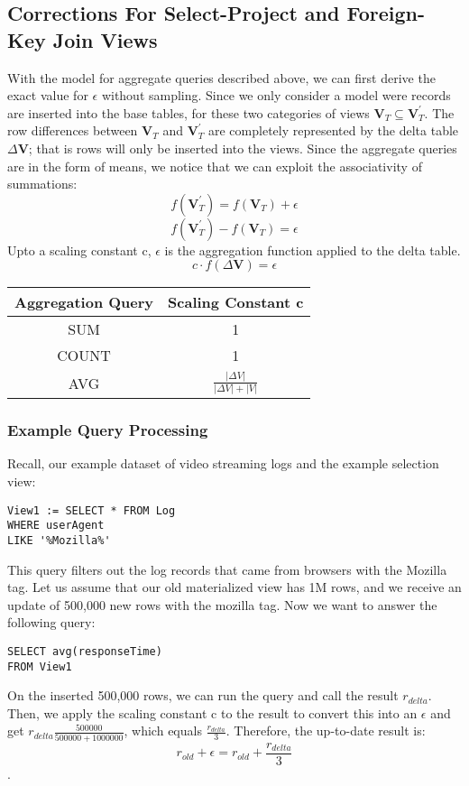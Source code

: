 \subsection{Corrections For Select-Project and Foreign-Key Join Views}
With the model for aggregate queries described above, we can
first derive the exact value for $\epsilon$ without sampling.
Since we only consider a model were records are inserted into the
base tables, for these two categories of views $\textbf{V}_{T}\subseteq\textbf{V}_{T}^{'}$.
The row differences between $\textbf{V}_{T}$ and $\textbf{V}_{T}^{'}$
are completely represented by the delta table $\Delta\textbf{V}$;
that is rows will only be inserted into the views. 
Since the aggregate queries are in the form of means, we notice that we 
can exploit the associativity of summations:
\[
f(\textbf{V}_{T}^{'})=f(\textbf{V}_{T})+\epsilon
\]
\[
f(\textbf{V}_{T}^{'})-f(\textbf{V}_{T})=\epsilon
\]
Upto a scaling constant c, $\epsilon$ is the aggregation function
applied to the delta table. 
\[
c\cdot f(\Delta\textbf{V})=\epsilon
\]

\begin{center}
\begin{tabular}{|c|c|}
\hline 
Aggregation Query & Scaling Constant c\tabularnewline
\hline 
\hline 
SUM & 1\tabularnewline
\hline 
COUNT & 1\tabularnewline
\hline 
AVG & $\frac{|\Delta V|}{|\Delta V|+|V|}$\tabularnewline
\hline 
\end{tabular}
\par\end{center}

\subsubsection{Example Query Processing}
Recall, our example dataset of video streaming logs and the example
selection view:
\begin{lstlisting}
View1 := SELECT * FROM Log 
WHERE userAgent 
LIKE '%Mozilla%'
\end{lstlisting}
This query filters out the log records that came from browsers with the Mozilla tag.
Let us assume that our old materialized view has 1M rows, and 
we receive an update of 500,000 new rows with the mozilla tag.
Now we want to answer the following query:
\begin{lstlisting}
SELECT avg(responseTime) 
FROM View1
\end{lstlisting}
On the inserted 500,000 rows, we can run the query and call the result $r_{delta}$.
Then, we apply the scaling constant c to the result to convert this into an $\epsilon$ and get $r_{delta}\frac{500000}{500000+1000000}$, which 
equals $\frac{r_{delta}}{3}$.
Therefore, the up-to-date result is:
\[r_{old} + \epsilon = r_{old} +\frac{r_{delta}}{3}\].

